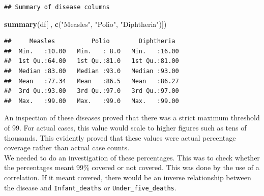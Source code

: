\documentclass[
  10pt,
]{article}
\newenvironment{Shaded}{\begin{snugshade}}{\end{snugshade}}
\newcommand{\AttributeTok}[1]{\textcolor[rgb]{0.13,0.29,0.53}{#1}}
\newcommand{\FunctionTok}[1]{\textcolor[rgb]{0.13,0.29,0.53}{\textbf{#1}}}
\newcommand{\NormalTok}[1]{#1}
\newcommand{\SpecialCharTok}[1]{\textcolor[rgb]{0.81,0.36,0.00}{\textbf{#1}}}
\newcommand{\StringTok}[1]{\textcolor[rgb]{0.31,0.60,0.02}{#1}}
\begin{document}
\begin{verbatim}
## Summary of disease columns
\end{verbatim}

\begin{Shaded}
\begin{Highlighting}[]
\FunctionTok{summary}\NormalTok{(df[ , }\FunctionTok{c}\NormalTok{(}\StringTok{"Measles"}\NormalTok{, }\StringTok{"Polio"}\NormalTok{, }\StringTok{"Diphtheria"}\NormalTok{)])}
\end{Highlighting}
\end{Shaded}

\begin{verbatim}
##     Measles          Polio        Diphtheria   
##  Min.   :10.00   Min.   : 8.0   Min.   :16.00  
##  1st Qu.:64.00   1st Qu.:81.0   1st Qu.:81.00  
##  Median :83.00   Median :93.0   Median :93.00  
##  Mean   :77.34   Mean   :86.5   Mean   :86.27  
##  3rd Qu.:93.00   3rd Qu.:97.0   3rd Qu.:97.00  
##  Max.   :99.00   Max.   :99.0   Max.   :99.00
\end{verbatim}

An inspection of these diseases proved that there was a strict maximum
threshold of 99. For actual cases, this value would scale to higher
figures such as tens of thousands. This evidently proved that these
values were actual percentage coverage rather than actual case counts.\\
We needed to do an investigation of these percentages. This was to check
whether the percentages meant 99\% covered or not covered. This was done
by the use of a correlation. If it meant covered, there would be an
inverse relationship between the disease and \texttt{Infant\_deaths} or
\texttt{Under\_five\_deaths}.\\

\begin{Shaded}
\end{Shaded}
\end{document}
